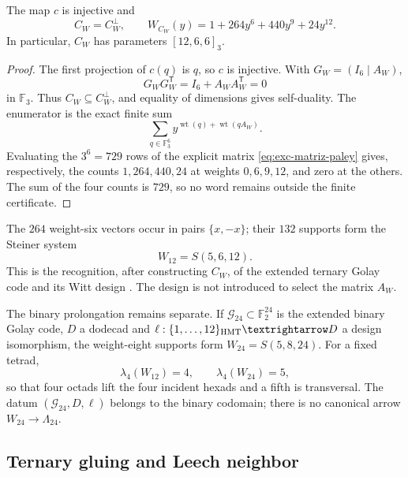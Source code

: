 \begin{theorem}
\label{thm:exc-codigo-ternario}
The map \(c\) is injective and
\begin{equation}
 C_W=C_W^\perp,
 \qquad
 W_{C_W}(y)=1+264y^6+440y^9+24y^{12}.
 \label{eq:exc-enumerador-cw}
\end{equation}
In particular, \(C_W\) has parameters \([12,6,6]_3\).
\end{theorem}

\begin{proof}
The first projection of \(c(q)\) is \(q\), so \(c\) is injective.
With \(G_W=(I_6\mid A_W)\),
\[
 G_WG_W^{\mathsf T}=I_6+A_WA_W^{\mathsf T}=0
\]
in \(\mathbb F_3\). Thus \(C_W\subseteq C_W^\perp\), and equality of
dimensions gives self-duality. The enumerator is the exact finite sum
\[
 \sum_{q\in\mathbb F_3^6}
 y^{\operatorname{wt}(q)+\operatorname{wt}(qA_W)}.
\]
Evaluating the \(3^6=729\) rows of the explicit matrix
\eqref{eq:exc-matriz-paley} gives, respectively, the counts
\(1,264,440,24\) at weights \(0,6,9,12\), and zero at the others. The sum
of the four counts is \(729\), so no word remains outside
the finite certificate.
\end{proof}

The \(264\) weight-six vectors occur in pairs \(\{x,-x\}\); their
\(132\) supports form the Steiner system
\begin{equation}
 W_{12}=S(5,6,12).
 \label{eq:exc-w12}
\end{equation}
This is the recognition, after constructing \(C_W\), of the extended ternary
Golay code and its Witt design
\citep{MacWilliamsSloane1977,ConwaySloane1999}. The design is not introduced
to select the matrix \(A_W\).

The binary prolongation remains separate. If
\(\mathcal G_{24}\subset\mathbb F_2^{24}\) is the extended binary
Golay code, \(D\) a dodecad and
\(\ell:\{1,\ldots,12\}_{\rm HMT}\to D\) a design isomorphism, the
weight-eight supports form \(W_{24}=S(5,8,24)\). For a fixed tetrad,
\[
 \lambda_4(W_{12})=4,
 \qquad
 \lambda_4(W_{24})=5,
\]
so that four octads lift the four incident hexads and a fifth
is transversal. The datum \((\mathcal G_{24},D,\ell)\) belongs to the binary
codomain; there is no canonical arrow \(W_{24}\to\Lambda_{24}\).

\subsection{Ternary gluing and Leech neighbor}

